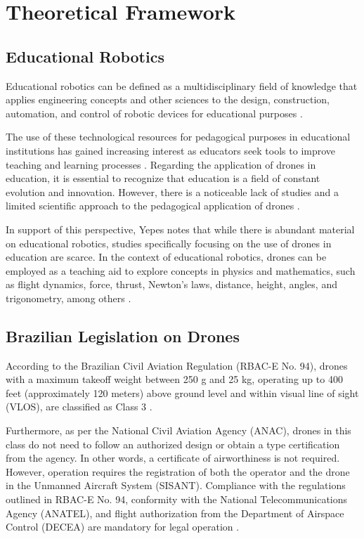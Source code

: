 \documentclass[conference]{IEEEtran}
\begin{document}
\section{Theoretical Framework}

\subsection{Educational Robotics}

Educational robotics can be defined as a multidisciplinary field of knowledge that applies engineering concepts and other sciences to the design, construction, automation, and control of robotic devices for educational purposes \cite{b1}.

The use of these technological resources for pedagogical purposes in educational institutions has gained increasing interest as educators seek tools to improve teaching and learning processes \cite{b12}. Regarding the application of drones in education, it is essential to recognize that education is a field of constant evolution and innovation. However, there is a noticeable lack of studies and a limited scientific approach to the pedagogical application of drones \cite{b9}.

In support of this perspective, Yepes \cite{b11} notes that while there is abundant material on educational robotics, studies specifically focusing on the use of drones in education are scarce. In the context of educational robotics, drones can be employed as a teaching aid to explore concepts in physics and mathematics, such as flight dynamics, force, thrust, Newton's laws, distance, height, angles, and trigonometry, among others \cite{b11}.

\subsection{Brazilian Legislation on Drones}

According to the Brazilian Civil Aviation Regulation (RBAC-E No. 94), drones with a maximum takeoff weight between 250 g and 25 kg, operating up to 400 feet (approximately 120 meters) above ground level and within visual line of sight (VLOS), are classified as Class 3 \cite{b2}.

Furthermore, as per the National Civil Aviation Agency (ANAC), drones in this class do not need to follow an authorized design or obtain a type certification from the agency. In other words, a certificate of airworthiness is not required. However, operation requires the registration of both the operator and the drone in the Unmanned Aircraft System (SISANT). Compliance with the regulations outlined in RBAC-E No. 94, conformity with the National Telecommunications Agency (ANATEL), and flight authorization from the Department of Airspace Control (DECEA) are mandatory for legal operation \cite{b2}.
\end{document}

